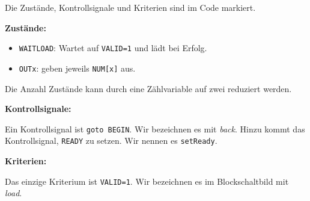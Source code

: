 \documentclass{CInf_practice}
\begin{document}
{
  \lstset{xleftmargin=0pt,xrightmargin=0pt}
  
}



Die Zustände, Kontrollsignale und Kriterien sind im Code markiert.

\bigskip

\textbf{Zustände:}

\begin{itemize}
	\item \texttt{WAITLOAD}: Wartet auf \texttt{VALID=1} und lädt bei Erfolg.
  \item \texttt{OUTx}: geben jeweils \texttt{NUM[x]} aus.
\end{itemize}

Die Anzahl Zustände kann durch eine Zählvariable auf zwei reduziert werden.

\bigskip

\textbf{Kontrollsignale:}

Ein Kontrollsignal ist \texttt{goto BEGIN}. Wir bezeichnen es mit \emph{back}. Hinzu kommt das Kontrollsignal, \texttt{READY} zu setzen. Wir nennen es \texttt{setReady}. 

\bigskip

\textbf{Kriterien:}

Das einzige Kriterium ist \texttt{VALID=1}. Wir bezeichnen es im Blockschaltbild mit \emph{load}.
\end{document}
